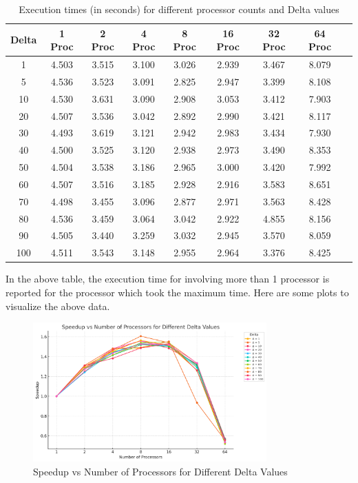 \documentclass{article}
\begin{document}
\begin{table}[h]
    \centering
    \begin{tabular}{|c|c|c|c|c|c|c|c|c|}
        \hline
        \textbf{Delta} & \textbf{1 Proc} & \textbf{2 Proc} & \textbf{4 Proc} & \textbf{8 Proc} & \textbf{16 Proc} & \textbf{32 Proc} & \textbf{64 Proc} \\
        \hline
        1   & 4.503  & 3.515  & 3.100  & 3.026  & 2.939  & 3.467 & 8.079 \\
        5  & 4.536  & 3.523  & 3.091  & 2.825  & 2.947   & 3.399   & 8.108      \\
        10  & 4.530  & 3.631  & 3.090  & 2.908  & 3.053   & 3.412   & 7.903    \\
        20  & 4.507  & 3.536  & 3.042 & 2.892   & 2.990  & 3.421 & 8.117   \\
        30 & 4.493  & 3.619  & 3.121  & 2.942  & 2.983   & 3.434   & 7.930  \\
        40 & 4.500   & 3.525  & 3.120  & 2.938  & 2.973   & 3.490   & 8.353  \\
        50 & 4.504   & 3.538  & 3.186  & 2.965  & 3.000   & 3.420   & 7.992     \\
        60 & 4.507   & 3.516  & 3.185  & 2.928  & 2.916   & 3.583   & 8.651    \\
        70 & 4.498   & 3.455  & 3.096  & 2.877  & 2.971   & 3.563   & 8.428    \\
        80 & 4.536   & 3.459  & 3.064  & 3.042  & 2.922   & 4.855   & 8.156   \\
        90 & 4.505   & 3.440  & 3.259  & 3.032  & 2.945   & 3.570   & 8.059    \\
        100 & 4.511  & 3.543  & 3.148  & 2.955  & 2.964   & 3.376   & 8.425      \\
        \hline
    \end{tabular}
    \caption{Execution times (in seconds) for different processor counts and Delta values}
    \label{tab:execution_times}
\end{table}

In the above table, the execution time for involving more than 1 processor is reported for the processor which took the maximum time. Here are some plots to visualize the above data.

\begin{figure}[h]
    \centering
    \includegraphics[width=0.8\textwidth]{speedup.png}
    \caption{Speedup vs Number of Processors for Different Delta Values}
    \label{fig:speedup}
\end{figure}
\end{document}
